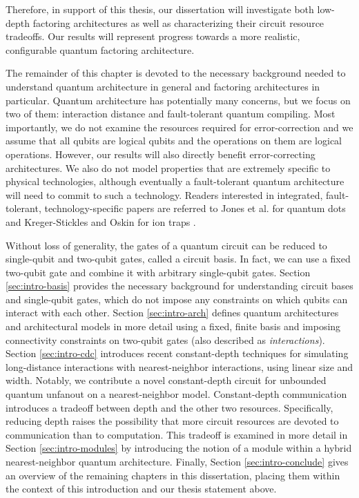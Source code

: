 Therefore,
in support of this thesis,
our dissertation will investigate both low-depth factoring architectures
as well as characterizing their circuit resource tradeoffs.
Our results will represent progress towards a more realistic, configurable
quantum factoring architecture.


The remainder of this chapter is devoted to the necessary background needed
to understand quantum architecture in general and factoring architectures
in particular. Quantum architecture has potentially many concerns, but we
focus on two of them: interaction distance and fault-tolerant quantum compiling.
Most importantly, we do not examine the resources required for error-correction
and we assume that all qubits are logical qubits and the operations on them
are logical operations. However, our results will also directly benefit
error-correcting architectures. We also do not model properties that are extremely
specific to physical technologies, although eventually a
fault-tolerant quantum architecture will need to commit to such a technology.
Readers interested in integrated, fault-tolerant,
technology-specific papers are referred
to Jones et al. for quantum dots \cite{Jones2010}
and Kreger-Stickles and Oskin for ion traps \cite{Kreger-Stickles2008}.

Without loss of generality, the gates of a quantum circuit can be reduced to
single-qubit and two-qubit gates, called a circuit basis.
In fact, we can use a fixed two-qubit gate
and combine it with arbitrary single-qubit gates.
Section \ref{sec:intro-basis} provides the necessary background for
understanding circuit bases and single-qubit gates,
which do not impose any constraints on
which qubits can interact with each other. Section \ref{sec:intro-arch}
defines quantum architectures and architectural models in more detail using a
fixed, finite basis
and imposing connectivity constraints on two-qubit gates (also
described as \emph{interactions}).
Section \ref{sec:intro-cdc} introduces recent constant-depth techniques
for simulating long-distance interactions with nearest-neighbor
interactions, using linear size and width. Notably, we contribute
a novel constant-depth circuit for
unbounded quantum unfanout on a nearest-neighbor model.
 Constant-depth communication
introduces a tradeoff between depth and the other two resources. Specifically,
reducing depth raises the possibility that more circuit resources are
devoted to communication than to computation. This tradeoff is examined 
in more detail in Section \ref{sec:intro-modules}
by introducing the notion of a module within a hybrid nearest-neighbor
quantum architecture.
Finally, Section \ref{sec:intro-conclude}
gives an overview of the remaining chapters in this dissertation,
placing them within the context of this introduction and our thesis statement
above.










